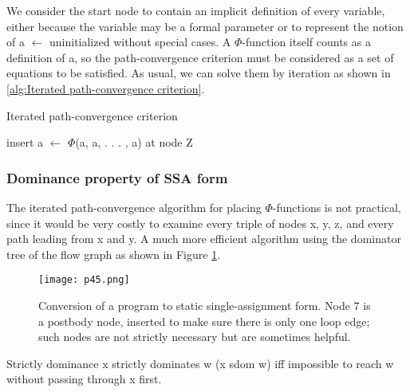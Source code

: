 

We consider the start node to contain an implicit definition of every variable, either because the variable may be a formal parameter or to represent the notion of a
$\leftarrow$ uninitialized without special cases. A $\Phi$-function itself counts as a definition of a, so the path-convergence criterion must be considered as a set of equations to be satisfied. As usual, we can solve them by iteration as shown in \ref{alg:Iterated path-convergence criterion}.


\begin{algorithm}
	\caption{Iterated path-convergence criterion}\label{alg:Iterated path-convergence criterion}
	\begin{algorithmic}

		\State  insert a $\leftarrow$ $\Phi$(a, a, . . . , a) at node Z
		\EndWhile
	\end{algorithmic}
\end{algorithm}

\subsubsection{Dominance property of SSA form}

The iterated path-convergence algorithm for placing $\Phi$-functions is not practical, since it would be very costly to examine every triple of nodes x, y, z, and every path leading from x and y.  A much more efficient algorithm using the dominator tree of the flow graph as shown in Figure \ref{fig:p45}.


\begin{figure}[H]
	\centering
	\texttt{[image: p45.png]}
	\caption{ Conversion of a program to static single-assignment form. Node 7 is a postbody node, inserted to make sure there is only one loop edge; such nodes are not strictly necessary but are sometimes helpful.}
	\label{fig:p45}

\end{figure}


\begin{definition}{Strictly dominance}
	x strictly dominates w (x sdom w) iff impossible to reach w without passing through x first.
\end{definition}

